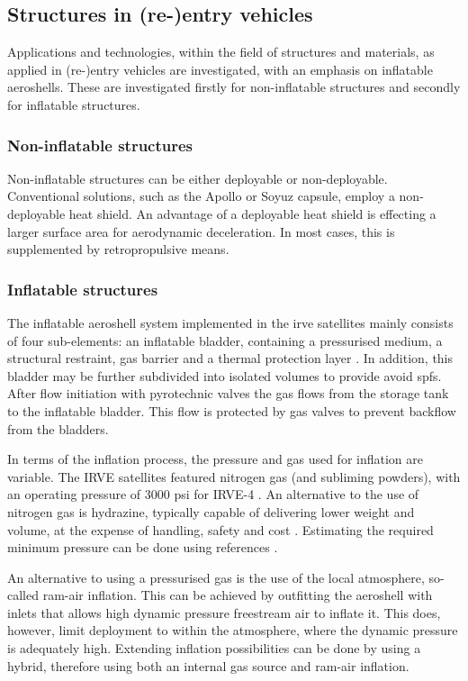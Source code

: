 \subsection{Structures in (re-)entry vehicles}\label{sec:struc}
Applications and technologies, within the field of structures and materials, as applied in (re-)entry vehicles are investigated, with an emphasis on inflatable aeroshells. These are investigated firstly for non-inflatable structures and secondly for inflatable structures.

\subsubsection{Non-inflatable structures}
Non-inflatable structures can be either deployable or non-deployable. Conventional solutions, such as the Apollo or Soyuz capsule, employ a non-deployable heat shield. An advantage of a deployable heat shield is effecting a larger surface area for aerodynamic deceleration. In most cases, this is supplemented by retropropulsive means.



\subsubsection{Inflatable structures}
The inflatable aeroshell system implemented in the \gls{irve} satellites mainly consists of four sub-elements: an inflatable bladder, containing a pressurised medium, a structural restraint, gas barrier and a thermal protection layer \cite{Hughes2005}. In addition, this bladder may be further subdivided into isolated volumes to provide avoid \gls{spfs}. After flow initiation with pyrotechnic valves the gas flows from the storage tank to the inflatable bladder. This flow is protected by gas valves to prevent backflow from the bladders. \cite{Hughes2005} 

In terms of the inflation process, the pressure and gas used for inflation are variable. The IRVE satellites featured nitrogen gas (and subliming powders), with an operating pressure of 3000 psi for IRVE-4 \cite{Litton2011}. An alternative to the use of nitrogen gas is hydrazine, typically capable of delivering lower weight and volume, at the expense of handling, safety and cost \cite{Freeland1998}. Estimating the required minimum pressure can be done using references \cite{Samareh2011, Brown2009}.

An alternative to using a pressurised gas is the use of the local atmosphere, so-called ram-air inflation. This can be achieved by outfitting the aeroshell with inlets that allows high dynamic pressure freestream air to inflate it. This does, however, limit deployment to within the atmosphere, where the dynamic pressure is adequately high. Extending inflation possibilities can be done by using a hybrid, therefore using both an internal gas source and ram-air inflation. \cite{Smith2010}

